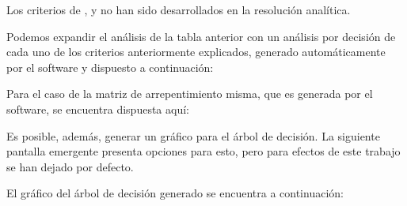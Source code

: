 Los criterios de ,  y  no han sido desarrollados en la resolución analítica.


Podemos expandir el análisis de la tabla anterior con un análisis por decisión de cada uno de los criterios anteriormente explicados, generado automáticamente por el software y dispuesto a continuación:


Para el caso de la matriz de arrepentimiento misma, que es generada por el software, se encuentra dispuesta aquí:


Es posible, además, generar un gráfico para el árbol de decisión. La siguiente pantalla emergente presenta opciones para esto, pero para efectos de este trabajo se han dejado por defecto.


El gráfico del árbol de decisión generado se encuentra a continuación:


\pagebreak